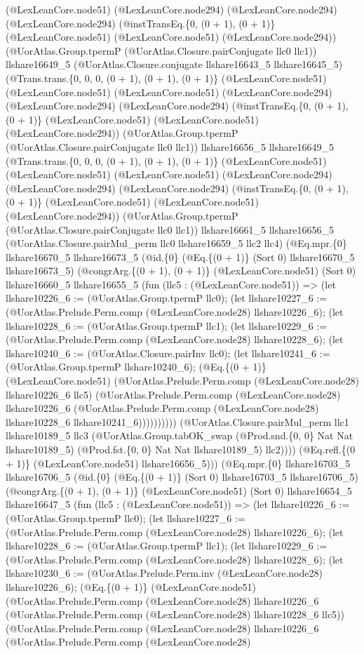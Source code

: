 \documentclass[11pt]{article}
\begin{document}
(@LexLeanCore.node51) (@LexLeanCore.node294) (@LexLeanCore.node294) (@LexLeanCore.node294) (@instTransEq.\{0, (0 + 1), (0 + 1)\} (@LexLeanCore.node51) (@LexLeanCore.node51) (@LexLeanCore.node294)) (@UorAtlas.Group.tpermP (@UorAtlas.Closure.pairConjugate llc0 llc1)) llshare16649\_5 (@UorAtlas.Closure.conjugate llshare16643\_5 llshare16645\_5) (@Trans.trans.\{0, 0, 0, (0 + 1), (0 + 1), (0 + 1)\} (@LexLeanCore.node51) (@LexLeanCore.node51) (@LexLeanCore.node51) (@LexLeanCore.node294) (@LexLeanCore.node294) (@LexLeanCore.node294) (@instTransEq.\{0, (0 + 1), (0 + 1)\} (@LexLeanCore.node51) (@LexLeanCore.node51) (@LexLeanCore.node294)) (@UorAtlas.Group.tpermP (@UorAtlas.Closure.pairConjugate llc0 llc1)) llshare16656\_5 llshare16649\_5 (@Trans.trans.\{0, 0, 0, (0 + 1), (0 + 1), (0 + 1)\} (@LexLeanCore.node51) (@LexLeanCore.node51) (@LexLeanCore.node51) (@LexLeanCore.node294) (@LexLeanCore.node294) (@LexLeanCore.node294) (@instTransEq.\{0, (0 + 1), (0 + 1)\} (@LexLeanCore.node51) (@LexLeanCore.node51) (@LexLeanCore.node294)) (@UorAtlas.Group.tpermP (@UorAtlas.Closure.pairConjugate llc0 llc1)) llshare16661\_5 llshare16656\_5 (@UorAtlas.Closure.pairMul\_perm llc0 llshare16659\_5 llc2 llc4) (@Eq.mpr.\{0\} llshare16670\_5 llshare16673\_5 (@id.\{0\} (@Eq.\{(0 + 1)\} (Sort 0) llshare16670\_5 llshare16673\_5) (@congrArg.\{(0 + 1), (0 + 1)\} (@LexLeanCore.node51) (Sort 0) llshare16660\_5 llshare16655\_5 (fun (llc5 : (@LexLeanCore.node51)) => (let llshare10226\_6 := (@UorAtlas.Group.tpermP llc0); (let llshare10227\_6 := (@UorAtlas.Prelude.Perm.comp (@LexLeanCore.node28) llshare10226\_6); (let llshare10228\_6 := (@UorAtlas.Group.tpermP llc1); (let llshare10229\_6 := (@UorAtlas.Prelude.Perm.comp (@LexLeanCore.node28) llshare10228\_6); (let llshare10240\_6 := (@UorAtlas.Closure.pairInv llc0); (let llshare10241\_6 := (@UorAtlas.Group.tpermP llshare10240\_6); (@Eq.\{(0 + 1)\} (@LexLeanCore.node51) (@UorAtlas.Prelude.Perm.comp (@LexLeanCore.node28) llshare10226\_6 llc5) (@UorAtlas.Prelude.Perm.comp (@LexLeanCore.node28) llshare10226\_6 (@UorAtlas.Prelude.Perm.comp (@LexLeanCore.node28) llshare10228\_6 llshare10241\_6)))))))))) (@UorAtlas.Closure.pairMul\_perm llc1 llshare10189\_5 llc3 (@UorAtlas.Group.tabOK\_swap (@Prod.snd.\{0, 0\} Nat Nat llshare10189\_5) (@Prod.fst.\{0, 0\} Nat Nat llshare10189\_5) llc2)))) (@Eq.refl.\{(0 + 1)\} (@LexLeanCore.node51) llshare16656\_5))) (@Eq.mpr.\{0\} llshare16703\_5 llshare16706\_5 (@id.\{0\} (@Eq.\{(0 + 1)\} (Sort 0) llshare16703\_5 llshare16706\_5) (@congrArg.\{(0 + 1), (0 + 1)\} (@LexLeanCore.node51) (Sort 0) llshare16654\_5 llshare16647\_5 (fun (llc5 : (@LexLeanCore.node51)) => (let llshare10226\_6 := (@UorAtlas.Group.tpermP llc0); (let llshare10227\_6 := (@UorAtlas.Prelude.Perm.comp (@LexLeanCore.node28) llshare10226\_6); (let llshare10228\_6 := (@UorAtlas.Group.tpermP llc1); (let llshare10229\_6 := (@UorAtlas.Prelude.Perm.comp (@LexLeanCore.node28) llshare10228\_6); (let llshare10230\_6 := (@UorAtlas.Prelude.Perm.inv (@LexLeanCore.node28) llshare10226\_6); (@Eq.\{(0 + 1)\} (@LexLeanCore.node51) (@UorAtlas.Prelude.Perm.comp (@LexLeanCore.node28) llshare10226\_6 (@UorAtlas.Prelude.Perm.comp (@LexLeanCore.node28) llshare10228\_6 llc5)) (@UorAtlas.Prelude.Perm.comp (@LexLeanCore.node28) llshare10226\_6 (@UorAtlas.Prelude.Perm.comp (@LexLeanCore.node28) 
\end{document}

